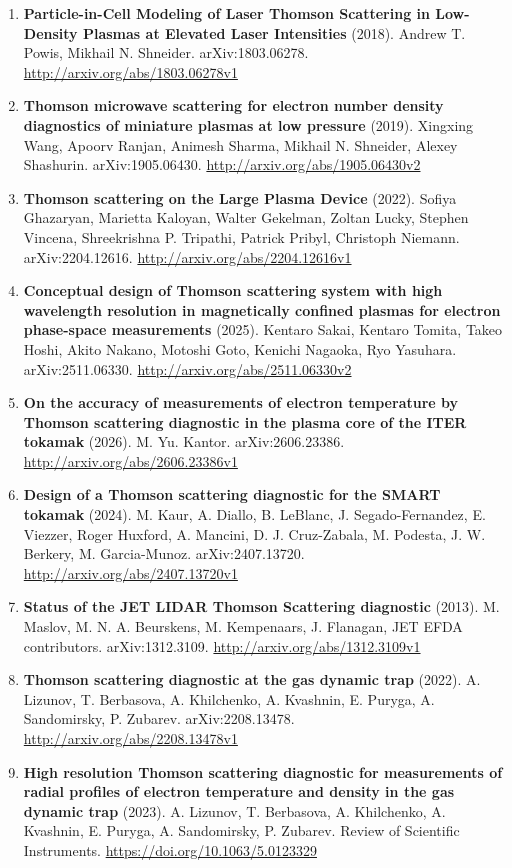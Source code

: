 \documentclass[11pt,a4paper]{article}
\begin{document}
\begin{enumerate}[leftmargin=1.4em]
\item \textbf{Particle-in-Cell Modeling of Laser Thomson Scattering in Low-Density Plasmas at Elevated Laser Intensities} (2018). Andrew T. Powis, Mikhail N. Shneider. arXiv:1803.06278. \url{http://arxiv.org/abs/1803.06278v1}
\item \textbf{Thomson microwave scattering for electron number density diagnostics of miniature plasmas at low pressure} (2019). Xingxing Wang, Apoorv Ranjan, Animesh Sharma, Mikhail N. Shneider, Alexey Shashurin. arXiv:1905.06430. \url{http://arxiv.org/abs/1905.06430v2}
\item \textbf{Thomson scattering on the Large Plasma Device} (2022). Sofiya Ghazaryan, Marietta Kaloyan, Walter Gekelman, Zoltan Lucky, Stephen Vincena, Shreekrishna P. Tripathi, Patrick Pribyl, Christoph Niemann. arXiv:2204.12616. \url{http://arxiv.org/abs/2204.12616v1}
\item \textbf{Conceptual design of Thomson scattering system with high wavelength resolution in magnetically confined plasmas for electron phase-space measurements} (2025). Kentaro Sakai, Kentaro Tomita, Takeo Hoshi, Akito Nakano, Motoshi Goto, Kenichi Nagaoka, Ryo Yasuhara. arXiv:2511.06330. \url{http://arxiv.org/abs/2511.06330v2}
\item \textbf{On the accuracy of measurements of electron temperature by Thomson scattering diagnostic in the plasma core of the ITER tokamak} (2026). M. Yu. Kantor. arXiv:2606.23386. \url{http://arxiv.org/abs/2606.23386v1}
\item \textbf{Design of a Thomson scattering diagnostic for the SMART tokamak} (2024). M. Kaur, A. Diallo, B. LeBlanc, J. Segado-Fernandez, E. Viezzer, Roger Huxford, A. Mancini, D. J. Cruz-Zabala, M. Podesta, J. W. Berkery, M. Garcia-Munoz. arXiv:2407.13720. \url{http://arxiv.org/abs/2407.13720v1}
\item \textbf{Status of the JET LIDAR Thomson Scattering diagnostic} (2013). M. Maslov, M. N. A. Beurskens, M. Kempenaars, J. Flanagan, JET EFDA contributors. arXiv:1312.3109. \url{http://arxiv.org/abs/1312.3109v1}
\item \textbf{Thomson scattering diagnostic at the gas dynamic trap} (2022). A. Lizunov, T. Berbasova, A. Khilchenko, A. Kvashnin, E. Puryga, A. Sandomirsky, P. Zubarev. arXiv:2208.13478. \url{http://arxiv.org/abs/2208.13478v1}
\item \textbf{High resolution Thomson scattering diagnostic for measurements of radial profiles of electron temperature and density in the gas dynamic trap} (2023). A. Lizunov, T. Berbasova, A. Khilchenko, A. Kvashnin, E. Puryga, A. Sandomirsky, P. Zubarev. Review of Scientific Instruments. \url{https://doi.org/10.1063/5.0123329}

\end{enumerate}
\end{document}
